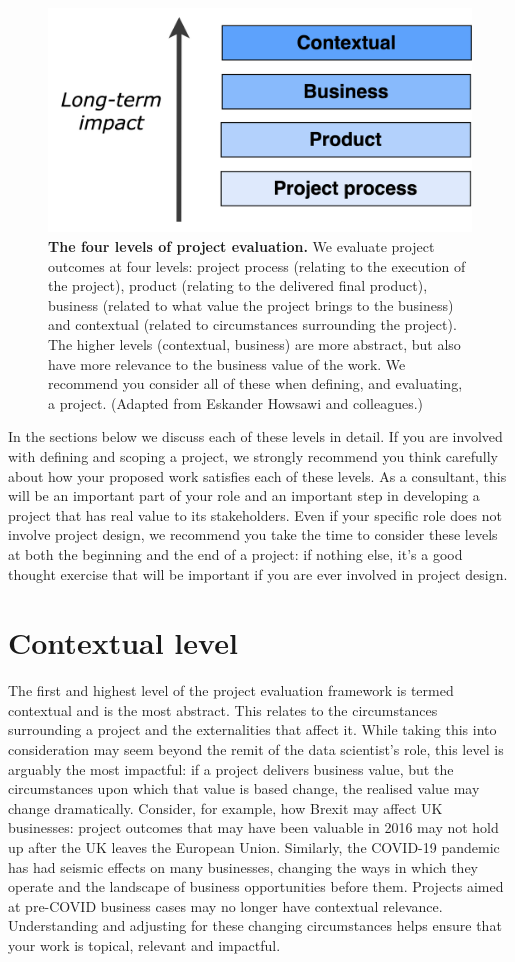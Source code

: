 \documentclass[
]{book}
\begin{document}
\begin{figure}
\includegraphics[width=0.7\linewidth]{figures/Figure_1-eval_levels} \caption{\textbf{The four levels of project evaluation.} We evaluate project outcomes at four levels: project process (relating to the execution of the project), product (relating to the delivered final product), business (related to what value the project brings to the business) and contextual (related to circumstances surrounding the project). The higher levels (contextual, business) are more abstract, but also have more relevance to the business value of the work. We recommend you consider all of these when defining, and evaluating, a project. (Adapted from Eskander Howsawi and colleagues.)}\label{fig:eval-levels}
\end{figure}

In the sections below we discuss each of these levels in detail. If you are involved with defining and scoping a project, we strongly recommend you think carefully about how your proposed work satisfies each of these levels. As a consultant, this will be an important part of your role and an important step in developing a project that has real value to its stakeholders. Even if your specific role does not involve project design, we recommend you take the time to consider these levels at both the beginning and the end of a project: if nothing else, it's a good thought exercise that will be important if you are ever involved in project design.

\hypertarget{contextual-level}{%
\section{Contextual level}\label{contextual-level}}

The first and highest level of the project evaluation framework is termed contextual and is the most abstract. This relates to the circumstances surrounding a project and the externalities that affect it. While taking this into consideration may seem beyond the remit of the data scientist's role, this level is arguably the most impactful: if a project delivers business value, but the circumstances upon which that value is based change, the realised value may change dramatically. Consider, for example, how Brexit may affect UK businesses: project outcomes that may have been valuable in 2016 may not hold up after the UK leaves the European Union. Similarly, the COVID-19 pandemic has had seismic effects on many businesses, changing the ways in which they operate and the landscape of business opportunities before them. Projects aimed at pre-COVID business cases may no longer have contextual relevance. Understanding and adjusting for these changing circumstances helps ensure that your work is topical, relevant and impactful.
\end{document}

